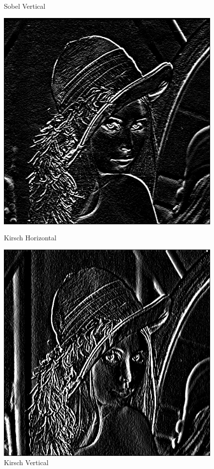 \documentclass[11pt]{article}
\begin{document}
\begin{figure}[H]
\begin{minipage}[c]{.46\linewidth}
			\caption{Sobel Vertical}
			\label{fig:SobelVertical}
		\end{minipage}
		\vskip 0.5cm
		\begin{minipage}[c]{.46\linewidth}
			\centering
			\includegraphics[scale=0.25]{Image/filtreKirschHorizontal.png}
			\caption{Kirsch Horizontal}
			\label{fig:KirschHorizontal}
		\end{minipage} \hfill
		\begin{minipage}[c]{.46\linewidth}
		\centering
			\includegraphics[scale=0.25]{Image/filtreKirschVertical.png}
			\caption{Kirsch Vertical}
			\label{fig:KirschVertical}
		\end{minipage}
	\end{figure}
\end{document}
